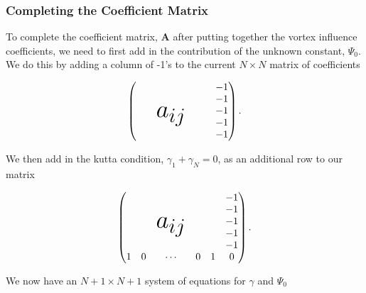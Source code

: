 \documentclass[]{article}
\begin{document}
\subsubsection{Completing the Coefficient Matrix}

To complete the coefficient matrix, \(\mathbf{A}\) after putting together the vortex influence coefficients, we need to first add in the contribution of the unknown constant, \(\Psi_0\).  We do this by adding a column of -1's to the current \(N \times N\) matrix of coefficients

\begin{equation}
\begin{pmatrix}
	& & & & & -1 \\
	& & \multirow{3}{*}{\Huge $a_{ij}$}  & & & -1 \\
	& & & & & -1 \\
	& & & & & -1 \\
	& & & & & -1
\end{pmatrix}.
\end{equation}

\noindent We then add in the kutta condition, \(\gamma_1 + \gamma_N = 0\), as an additional row to our matrix




 \begin{equation}
 	\begin{pmatrix}
 		& & & & & -1 \\
 		& & \multirow{3}{*}{\Huge $a_{ij}$}  & & & -1 \\
 		& & & & & -1 \\
 		& & & & & -1 \\
 		& & & & & -1 \\
 		1 & 0 & \cdots & 0 & 1 & 0
 	\end{pmatrix}.
 \end{equation}

We now have an \(N+1 \times N+1 \) system of equations for \(\gamma\) and \(\Psi_0\)
\end{document}

